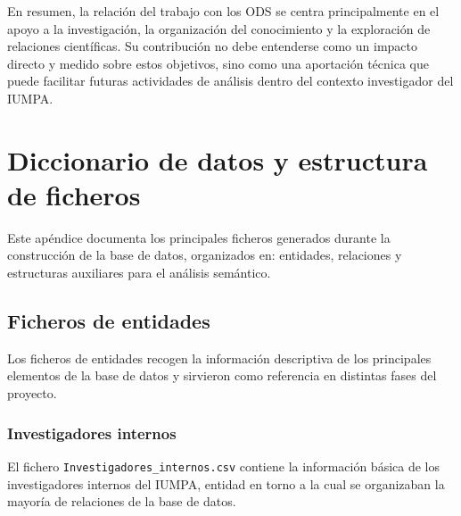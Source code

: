 \documentclass[11pt,spanish,listoffigures,listoftables]{tfgetsinf}
\begin{document}
En resumen, la relación del trabajo con los ODS se centra principalmente en el apoyo a la investigación, la organización del conocimiento y la exploración de relaciones científicas. Su contribución no debe entenderse como un impacto directo y medido sobre estos objetivos, sino como una aportación técnica que puede facilitar futuras actividades de análisis dentro del contexto investigador del IUMPA.


\chapter{Diccionario de datos y estructura de ficheros}
\label{ap:diccionario_datos}

Este apéndice documenta los principales ficheros generados durante la construcción de la base de datos, organizados en: entidades, relaciones y estructuras auxiliares para el análisis semántico.

\section{Ficheros de entidades}

Los ficheros de entidades recogen la información descriptiva de los principales elementos de la base de datos y sirvieron como referencia en distintas fases del proyecto.

\subsection{Investigadores internos}

El fichero \texttt{Investigadores\_internos.csv} contiene la información básica de los investigadores internos del IUMPA, entidad en torno a la cual se organizaban la mayoría de relaciones de la base de datos.
\end{document}
